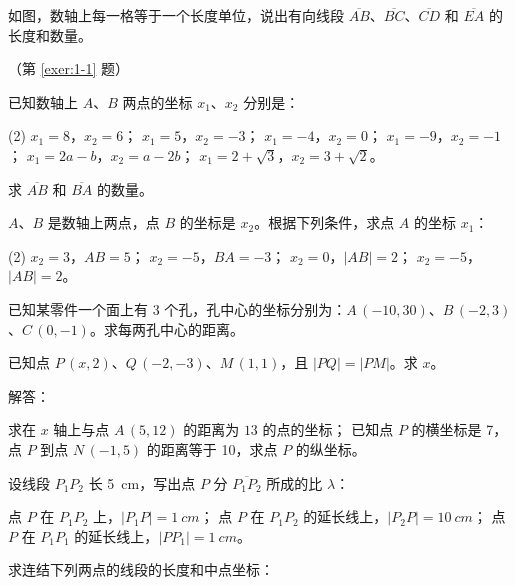 \begin{Exercise}
  \begin{question}
    \item\label{exer:1-1} 如图，数轴上每一格等于一个长度单位，说出有向线段 $\overline{AB}$、$\overline{BC}$、$\overline{CD}$ 和 $\overline{EA}$ 的长度和数量。
    
    \begin{figurehere}
      \begin{minipage}{\linewidth}\centering
        \caption*{（第 \ref{exer:1-1} 题）}
      \end{minipage}
    \end{figurehere}
    \item 已知数轴上 $A$、$B$ 两点的坐标 $x_1$、$x_2$ 分别是：
    \begin{tasks}(2)
      \task $x_1=8$，$x_2=6$；
      \task $x_1=5$，$x_2=-3$；
      \task $x_1=-4$，$x_2=0$；
      \task $x_1=-9$，$x_2=-1$；
      \task $x_1=2a-b$，$x_2=a-2b$；
      \task $x_1=2+\sqrt{3}$，$x_2=3+\sqrt{2}$。
    \end{tasks}
    求 $\overline{AB}$ 和 $\overline{BA}$ 的数量。
    \item $A$、$B$ 是数轴上两点，点 $B$ 的坐标是 $x_2$。根据下列条件，求点 $A$ 的坐标 $x_1$：
    \begin{tasks}(2)
      \task $x_2=3$，$AB=5$；
      \task $x_2=-5$，$BA=-3$；
      \task $x_2=0$，$|AB|=2$；
      \task $x_2=-5$，$|AB|=2$。
    \end{tasks}
    \item 已知某零件一个面上有 3 个孔，孔中心的坐标分别为：$A\,(-10,30)$、$B\,(-2,3)$、$C\,(0,-1)$。求每两孔中心的距离。
    \item 已知点 $P\,(x,2)$、$Q\,(-2,-3)$、$M\,(1,1)$，且 $|PQ|=|PM|$。求 $x$。
    \item 解答：
    \begin{tasks}
      \task 求在 $x$ 轴上与点 $A\,(5,12)$ 的距离为 $13$ 的点的坐标；
      \task 已知点 $P$ 的横坐标是 7，点 $P$ 到点 $N\,(-1,5)$ 的距离等于 10，求点 $P$ 的纵坐标。
    \end{tasks}
    \item 设线段 $P_1P_2$ 长 \qty{5}{cm}，写出点 $P$ 分 $\overline{P_1P_2}$ 所成的比 $\lambda$：
    \begin{tasks}
      \task 点 $P$ 在 $P_1P_2$ 上，$|P_1P|=\qty{1}{cm}$；
      \task 点 $P$ 在 $P_1P_2$ 的延长线上，$|P_2P|=\qty{10}{cm}$；
      \task 点 $P$ 在 $P_1P_1$ 的延长线上，$|PP_1|=\qty{1}{cm}$。
    \end{tasks}
    \item 求连结下列两点的线段的长度和中点坐标：

\end{question}
\end{Exercise}
